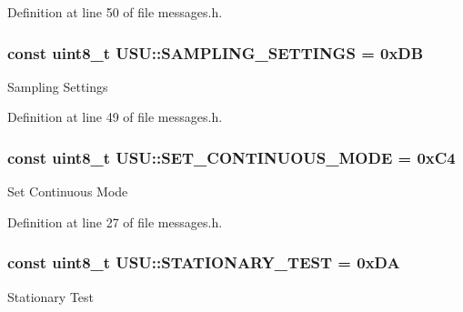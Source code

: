 \-Definition at line 50 of file messages.\-h.

\hypertarget{namespace_u_s_u_aeb8ec20b4bb74ff2895ab487c29810e0}{
\subsubsection[{\-S\-A\-M\-P\-L\-I\-N\-G\-\_\-\-S\-E\-T\-T\-I\-N\-G\-S}]{\setlength{\rightskip}{0pt plus 5cm}const uint8\-\_\-t {\bf \-U\-S\-U\-::\-S\-A\-M\-P\-L\-I\-N\-G\-\_\-\-S\-E\-T\-T\-I\-N\-G\-S} = 0x\-D\-B}}\label{namespace_u_s_u_aeb8ec20b4bb74ff2895ab487c29810e0}
\-Sampling \-Settings 

\-Definition at line 49 of file messages.\-h.

\hypertarget{namespace_u_s_u_a1f3d4b142078bc61d7dea5676b399d29}{
\subsubsection[{\-S\-E\-T\-\_\-\-C\-O\-N\-T\-I\-N\-U\-O\-U\-S\-\_\-\-M\-O\-D\-E}]{\setlength{\rightskip}{0pt plus 5cm}const uint8\-\_\-t {\bf \-U\-S\-U\-::\-S\-E\-T\-\_\-\-C\-O\-N\-T\-I\-N\-U\-O\-U\-S\-\_\-\-M\-O\-D\-E} = 0x\-C4}}\label{namespace_u_s_u_a1f3d4b142078bc61d7dea5676b399d29}
\-Set \-Continuous \-Mode 

\-Definition at line 27 of file messages.\-h.

\hypertarget{namespace_u_s_u_aa13337d52a46707f63911e7c2972971b}{
\subsubsection[{\-S\-T\-A\-T\-I\-O\-N\-A\-R\-Y\-\_\-\-T\-E\-S\-T}]{\setlength{\rightskip}{0pt plus 5cm}const uint8\-\_\-t {\bf \-U\-S\-U\-::\-S\-T\-A\-T\-I\-O\-N\-A\-R\-Y\-\_\-\-T\-E\-S\-T} = 0x\-D\-A}}\label{namespace_u_s_u_aa13337d52a46707f63911e7c2972971b}
\-Stationary \-Test 


